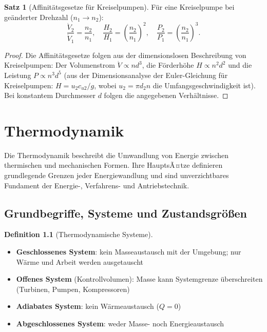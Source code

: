 ﻿\documentclass[a4paper,12pt]{report}
\theoremstyle{definition}
\newtheorem{definition}{Definition}
\newtheorem{satz}{Satz}
\begin{document}
\begin{satz}[Affinit\"atsgesetze f\"ur Kreiselpumpen]
F\"ur eine Kreiselpumpe bei ge\"anderter Drehzahl ($n_1 \to n_2$):
\[
  \frac{\dot{V}_2}{\dot{V}_1} = \frac{n_2}{n_1}, \quad
  \frac{H_2}{H_1} = \left(\frac{n_2}{n_1}\right)^2, \quad
  \frac{P_2}{P_1} = \left(\frac{n_2}{n_1}\right)^3.
\]
\end{satz}
\begin{proof}
Die Affinit\"atsgesetze folgen aus der dimensionslosen Beschreibung
von Kreiselpumpen: Der Volumenstrom $\dot{V} \propto n d^3$,
die F\"orderh\"ohe $H \propto n^2 d^2$ und die Leistung $P \propto n^3 d^5$
(aus der Dimensionsanalyse der Euler-Gleichung f\"ur Kreiselpumpen:
$H = u_2 c_{u2}/g$, wobei $u_2 = \pi d_2 n$ die Umfangsgeschwindigkeit ist).
Bei konstantem Durchmesser $d$ folgen die angegebenen Verh\"altnisse.
\end{proof}

\chapter{Thermodynamik}

Die Thermodynamik beschreibt die Umwandlung von Energie zwischen
thermischen und mechanischen Formen. Ihre HauptsÃ¤tze definieren
grundlegende Grenzen jeder Energiewandlung und sind unverzichtbares
Fundament der Energie-, Verfahrens- und Antriebstechnik.

\section{Grundbegriffe, Systeme und Zustandsgr\"o\ss{}en}

\begin{definition}[Thermodynamische Systeme]
\begin{itemize}
    \item[-] \textbf{Geschlossenes System}: kein Masseaustausch mit der Umgebung;
          nur W\"arme und Arbeit werden ausgetauscht
    \item[-] \textbf{Offenes System} (Kontrollvolumen): Masse kann Systemgrenze
          \"uberschreiten (Turbinen, Pumpen, Kompressoren)
    \item[-] \textbf{Adiabates System}: kein W\"armeaustausch ($Q = 0$)
    \item[-] \textbf{Abgeschlossenes System}: weder Masse- noch Energieaustausch
\end{itemize}
\end{definition}
\end{document}
